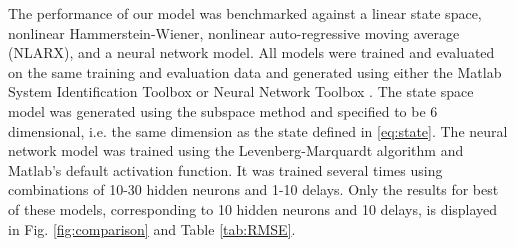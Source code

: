 The performance of our model was benchmarked against a linear state space, nonlinear Hammerstein-Wiener, nonlinear auto-regressive moving average (NLARX), and a neural network model.
All models were trained and evaluated on the same training and evaluation data and generated using either the Matlab System Identification Toolbox or Neural Network Toolbox \cite{MATLAB:2017}.
The state space model was generated using the subspace method \cite[Chapter 7]{ljung1987system} and specified to be 6 dimensional, i.e. the same dimension as the state defined in \ref{eq:state}.
The neural network model was trained using the Levenberg-Marquardt algorithm and Matlab's default activation function.
It was trained several times using combinations of 10-30 hidden neurons and 1-10 delays.
Only the results for best of these models, corresponding to 10 hidden neurons and 10 delays, is displayed in Fig. \ref{fig:comparison} and Table \ref{tab:RMSE}.